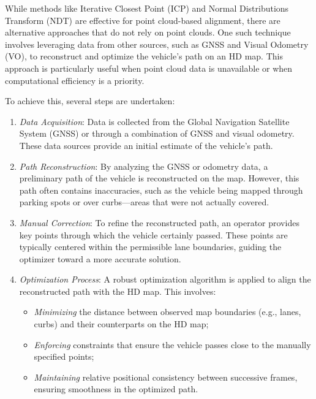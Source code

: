 While methods like Iterative Closest Point (ICP) and Normal Distributions Transform (NDT) are effective for point cloud-based alignment, there are alternative approaches that do not rely on point clouds. One such technique involves leveraging data from other sources, such as GNSS and Visual Odometry (VO), to reconstruct and optimize the vehicle's path on an HD map. This approach is particularly useful when point cloud data is unavailable or when computational efficiency is a priority.

To achieve this, several steps are undertaken:
\begin{enumerate}
    \item \textit{Data Acquisition}: Data is collected from the Global Navigation Satellite System (GNSS) or through a combination of GNSS and visual odometry. These data sources provide an initial estimate of the vehicle's path.
    \item \textit{Path Reconstruction}: By analyzing the GNSS or odometry data, a preliminary path of the vehicle is reconstructed on the map. However, this path often contains inaccuracies, such as the vehicle being mapped through parking spots or over curbs—areas that were not actually covered. 
    \item \textit{Manual Correction}: To refine the reconstructed path, an operator provides key points through which the vehicle certainly passed. These points are typically centered within the permissible lane boundaries, guiding the optimizer toward a more accurate solution.
    \item \textit{Optimization Process}: A robust optimization algorithm is applied to align the reconstructed path with the HD map. This involves:
    \begin{itemize}
        \item \textit{Minimizing} the distance between observed map boundaries (e.g., lanes, curbs) and their counterparts on the HD map;
        \item \textit{Enforcing} constraints that ensure the vehicle passes close to the manually specified points;
        \item \textit{Maintaining} relative positional consistency between successive frames, ensuring smoothness in the optimized path.
    \end{itemize}
\end{enumerate}

